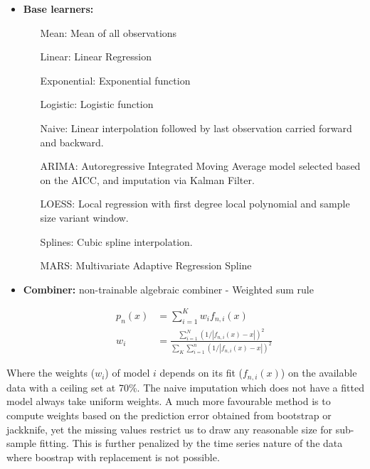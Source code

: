 \documentclass[nojss]{jss}\usepackage[]{graphicx}\usepackage[]{color}
\begin{document}
\begin{itemize}
  \item {\textbf{Base learners:}}
    \begin{itemize}
      \setlength{\leftmargini}{5em}
      \item[Mean:] Mean of all observations
      \item [Linear:] Linear Regression
      \item [Exponential:] Exponential function
      \item [Logistic:] Logistic function        
      \item [Naive:] Linear interpolation followed by last observation
        carried forward and backward.
      \item [ARIMA:] Autoregressive Integrated Moving Average model
        selected based on the AICC, and imputation via Kalman Filter.
      \item [LOESS:] Local regression with first degree local
        polynomial and sample size variant window.
      \item [Splines:] Cubic spline interpolation.
      \item [MARS:] Multivariate Adaptive Regression Spline
    \end{itemize}
  \item {\textbf{Combiner:}}
    non-trainable algebraic combiner - Weighted sum rule

    \begin{align}
      p_n(x) &= \sum_{i=1}^K w_i f_{n, i}(x) \nonumber \\
      w_i &= \frac{\sum_{i = 1}^N(1/|f_{n, i}(x) - x|)^2}{\sum_{K}\sum_{i=1}^n(1/|f_{n, i}(x) - x|)^2}\nonumber
    \end{align}
    
    
\end{itemize}

Where the weights ($w_i$) of model $i$ depends on its fit ($f_{n,
  i}(x)$) on the available data with a ceiling set at 70\%. The naive
imputation which does not have a fitted model always take uniform
weights. A much more favourable method is to compute weights based on
the prediction error obtained from bootstrap or jackknife, yet the
missing values restrict us to draw any reasonable size for sub-sample
fitting. This is further penalized by the time series nature of the
data where boostrap with replacement is not possible.\\
\end{document}

